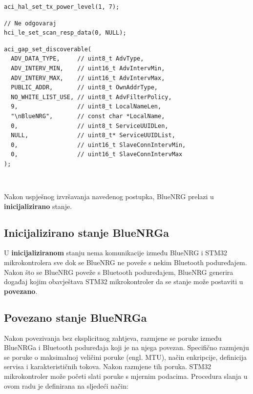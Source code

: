 \documentclass[times, utf8, diplomski]{diplomski}
\begin{document}
\begin{lstlisting}[caption={Postavi snagu odašiljača}]
aci_hal_set_tx_power_level(1, 7);
\end{lstlisting}

\begin{lstlisting}[caption={Postavi odgovor na poruku otkrivanja (engl. discover message)}]
// Ne odgovaraj
hci_le_set_scan_resp_data(0, NULL);
\end{lstlisting}

\begin{lstlisting}[caption={Postavi stanje BlueNRGa u stanje u povezivo stanje}, label={lastinit}]
aci_gap_set_discoverable(
  ADV_DATA_TYPE,     // uint8_t AdvType,
  ADV_INTERV_MIN,    // uint16_t AdvIntervMin,
  ADV_INTERV_MAX,    // uint16_t AdvIntervMax,
  PUBLIC_ADDR,       // uint8_t OwnAddrType,
  NO_WHITE_LIST_USE, // uint8_t AdvFilterPolicy,
  9,                 // uint8_t LocalNameLen,
  "\nBlueNRG",       // const char *LocalName,
  0,                 // uint8_t ServiceUUIDLen,
  NULL,              // uint8_t* ServiceUUIDList,
  0,                 // uint16_t SlaveConnIntervMin,
  0,                 // uint16_t SlaveConnIntervMax
);
\end{lstlisting}
\ \

Nakon uspješnog izvršavanja navedenog postupka, BlueNRG prelazi u \textbf{inicijalizirano} stanje.

\subsection{Inicijalizirano stanje BlueNRGa}
U \textbf{inicijaliziranom} stanju nema komunikacije između BlueNRG i STM32 mikrokontrolera sve dok se BlueNRG ne poveže s nekim Bluetooth poduređajem. Nakon što se BlueNRG poveže s Bluetooth poduređajem, BlueNRG generira događaj kojim obavještava STM32 mikrokontroler da se stanje može postaviti u \textbf{povezano}.

\subsection{Povezano stanje BlueNRGa}
Nakon povezivanja bez eksplicitnog zahtjeva, razmjene se poruke između BlueNRGa i Bluetooth poduređaja koji je na njega povezan. Specifično razmjenju se poruke o maksimalnoj veličini poruke (engl. MTU), način enkripcije, definicija servisa i karakterističnih tokova. Nakon razmjene tih poruka. STM32 mikrokontroler može početi slati poruke s mjernim podacima. Procedura slanja u ovom radu je definirana na sljedeći način:
\end{document}
